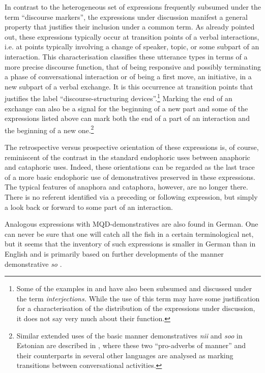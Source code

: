 \documentclass[output=paper,colorlinks,citecolor=brown]{langscibook}
\begin{document}
In contrast to the heterogeneous set of expressions frequently subsumed under the term “discourse markers”, the expressions under discussion manifest a general property that justifies their inclusion under a common term. As already pointed out, these expressions typically occur at transition points of a verbal interactions, i.e. at points typically involving a change of speaker, topic, or some subpart of an interaction. This characterisation classifies these utterance types in terms of a more precise discourse function, that of being responsive and possibly terminating a phase of conversational interaction or of being a first move, an initiative, in a new subpart of a verbal exchange. It is this occurrence at transition points that justifies the label “discourse-structuring devices”.\footnote{Some of the examples in  and  have also been subsumed and discussed under the term \textit{interjections.} While the use of this term may have some justification for a characterisation of the distribution of the expressions under discussion, it does not say very much about their function.} Marking the end of an exchange can also be a signal for the beginning of a new part and some of the expressions listed above can mark both the end of a part of an interaction and the beginning of a new one.\footnote{Similar extended uses of the basic manner demonstratives \textit{nii} and \textit{soo} in Estonian are described in \citet{Keevallik2005,Keevallik2010}, where these two “pro-adverbs of manner” and their counterparts in several other languages are analysed as marking transitions between conversational activities.}

The retrospective versus prospective orientation of these expressions is, of course, reminiscent of the contrast in the standard endophoric uses between anaphoric and cataphoric uses. Indeed, these orientations can be regarded as the last trace of a more basic endophoric use of demonstratives preserved in these expressions. The typical features of anaphora and cataphora, however, are no longer there. There is no referent identified via a preceding or following expression, but simply a look back or forward to some part of an interaction.

Analogous expressions with MQD-demonstratives are also found in German. One can never be sure that one will catch all the fish in a certain terminological net, but it seems that the inventory of such expressions is smaller in German than in English and is primarily based on further developments of the manner demonstrative \textit{so} .
\end{document}
